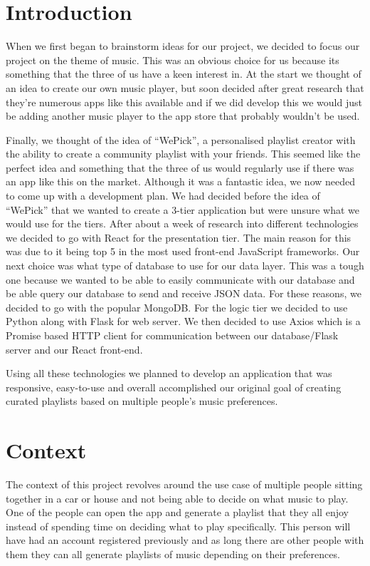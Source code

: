 \chapter{Introduction}
When we first began to brainstorm ideas for our project, we decided to focus our project on the theme of music. This was an obvious choice for us because its something that the three of us have a keen interest in. At the start we thought of an idea to create our own music player, but soon decided after great research\cite{MusicApps}  that they’re numerous apps like this available and if we did develop this we would just be adding another music player to the app store that probably wouldn’t be used. 
\par
Finally, we thought of the idea of “WePick”, a personalised playlist creator with the ability to create a community playlist with your friends. This seemed like the perfect idea and something that the three of us would regularly use if there was an app like this on the market. Although it was a fantastic idea, we now needed to come up with a development plan. We had decided before the idea of “WePick” that we wanted to create a 3-tier application but were unsure what we would use for the tiers. After about a week of research into different technologies we decided to go with React for the presentation tier. The main reason for this was due to it being top 5 in the most used front-end JavaScript frameworks\cite{Top5Frontend}. Our next choice was what type of database to use for our data layer. This was a tough one because we wanted to be able to easily communicate with our database and be able query our database to send and receive JSON data. For these reasons, we decided to go with the popular MongoDB. For the logic tier we decided to use Python along with Flask for web server. We then decided to use Axios which is a Promise based HTTP client for communication between our database/Flask server and our React front-end.
\par
Using all these technologies we planned to develop an application that was responsive, easy-to-use and overall accomplished our original goal of creating curated playlists based on multiple people's music preferences.



\chapter{Context}
The context of this project revolves around the use case of multiple people sitting together in a car or house and not being able to decide on what music to play. One of the people can open the app and generate a playlist that they all enjoy instead of spending time on deciding what to play specifically.
This person will have had an account registered previously and as long there are other people with them they can all generate playlists of music depending on their preferences.\newline

